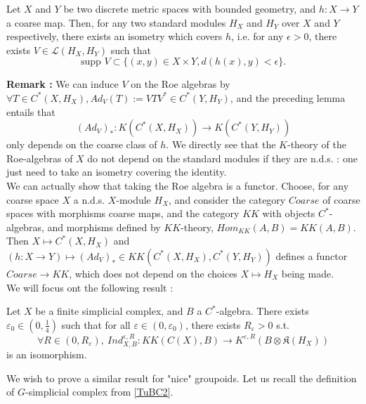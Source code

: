 \begin{lem}
Let $X$ and $Y$ be two discrete metric spaces with bounded geometry, and $h : X\rightarrow Y$ a coarse map. Then, for any two standard modules $H_X$ and $H_Y$ over $X$ and $Y$ respectively, there exists an isometry which covers $h$, i.e. for any $\epsilon >0$, there exists $V\in \mathcal L(H_X,H_Y)$ such that 
\[\text{supp }V \subset \{(x,y)\in X\times Y, d(h(x),y)<\epsilon\}.\]
\end{lem}

\textbf{Remark :} We can induce $V$ on the Roe algebras by $\forall T\in C^*(X,H_X), Ad_V(T) := V T V^* \in C^*(Y,H_Y)$, and the preceding lemma entails that \[(Ad_V)_* : K(C^*(X,H_X))\rightarrow K(C^*(Y,H_Y))\] only depends on the coarse class of $h$. We directly see that the $K$-theory of the Roe-algebras of $X$ do not depend on the standard modules if they are n.d.s. : one just need to take an isometry covering the identity. \\

We can actually show that taking the Roe algebra is a functor. Choose, for any coarse space $X$ a n.d.s. $X$-module $H_X$, and consider the category $Coarse$ of coarse spaces with morphisms coarse maps, and the category $KK$ with objects $C^*$-algebras, and morphisms defined by $KK$-theory, $Hom_{KK}(A,B)=KK(A,B)$. Then $ X \mapsto C^*(X,H_X) $ and $\left(h:X \rightarrow Y\right) \mapsto (Ad_V)_*\in KK(C^*(X,H_X),C^*(Y,H_Y))$ defines a functor $Coarse \rightarrow KK$, which does not depend on the choices $X\mapsto H_X$ being made.\\

We will focus ont the following result :

\begin{thm}
Let $X$ be a finite simplicial complex, and $B$ a $C^*$-algebra. There exists $\varepsilon_0\in (0,\frac{1}{4})$ such that for all $\varepsilon \in (0,\varepsilon_0)$, there exists $R_\varepsilon>0 $ s.t. 
\[\forall R\in (0,R_\varepsilon),\  Ind_{X,B}^{\varepsilon, R} : KK(C(X),B)\rightarrow K^{\varepsilon,R}(B\otimes \mathfrak K(H_X))\] 
is an isomorphism.
\end{thm}

We wish to prove a similar result for "nice" groupoids. Let us recall the definition of $G$-simplicial complex from \ref{TuBC2}.

